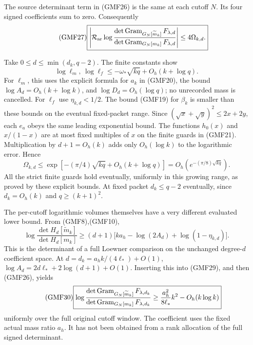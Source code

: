 The source determinant term in (GMF26) is the same at
each cutoff \(N\).  Its four signed coefficients sum to zero.
Consequently
\begin{equation}\tag{GMF27}
 \boxed{
 \left|\mathcal R_{\rm ar}
 \log\frac{\det\operatorname{Gram}_{G_N[\widetilde m_k]}F_{\lambda,d}}
              {\det\operatorname{Gram}_{G_N[m_k]}F_{\lambda,d}}
 \right|\le4\Omega_{k,d}.}
\end{equation}

Take \(0\le d\le\min(d_k,q-2)\).
The finite constants show
\[
 \log\ell_m,\ \log\ell_f
 \le-\omega_*\sqrt{kq}+O_h(k+\log q).
\]
For \(\ell_m\), this uses the explicit formula for \(a_k\)
in (GMF20), the bound \(\log A_d=O_h(k+\log k)\), and
\(\log D_d=O_h(\log q)\); no unrecorded mass is cancelled.
For \(\ell_f\) use \(\eta_{k,d}<1/2\).
The bound (GMF19) for \(\beta_k\) is smaller than these
bounds on the eventual fixed-packet range.
Since \((\sqrt x+\sqrt y)^2\le2x+2y\), each \(e_a\) obeys
the same leading exponential bound.  The functions
\(h_0(x)\) and \(x/(1-x)\) are at most fixed multiples
of \(x\) on the finite guards in (GMF21).
Multiplication by \(d+1=O_h(k)\) adds only \(O_h(\log k)\)
to the logarithmic error.  Hence
\begin{equation}\tag{GMF28}
 \Omega_{k,d}\le
 \exp[-(\pi/4)\sqrt{kq}+O_h(k+\log q)]
 =O_h(e^{-(\pi/8)\sqrt{kq}}).
\end{equation}
All the strict finite guards hold eventually, uniformly in
this growing range, as proved by these explicit bounds.
At fixed packet \(d_k\le q-2\) eventually, since \(d_k=O_h(k)\)
and \(q\ge(k+1)^2\).

The per-cutoff logarithmic volumes themselves have a very
different evaluated lower bound.  From (GMF8),(GMF10),
\begin{equation}\tag{GMF29}
 \log\frac{\det H_d[\widetilde m_k]}{\det H_d[m_k]}
 \ge(d+1)\bigl[
 ka_h-\log(2A_d)+\log(1-\eta_{k,d})\bigr].
\end{equation}
This is the determinant of a full Loewner comparison on
the unchanged degree-\(d\) coefficient space.
At \(d=d_k=a_hk/(4\ell_*)+O(1)\),
\(\log A_d=2d\ell_*+2\log(d+1)+O(1)\).
Inserting this into (GMF29), and then (GMF26), yields
\begin{equation}\tag{GMF30}
 \boxed{
 \log\frac{\det\operatorname{Gram}_{G_N[\widetilde m_k]}F_{\lambda,d_k}}
              {\det\operatorname{Gram}_{G_N[m_k]}F_{\lambda,d_k}}
 \ge\frac{a_h^2}{8\ell_*}k^2-O_h(k\log k)}
\end{equation}
uniformly over the full original cutoff window.
The coefficient uses the fixed actual mass ratio \(a_h\).
It has not been obtained from a rank allocation of the
full signed determinant.

